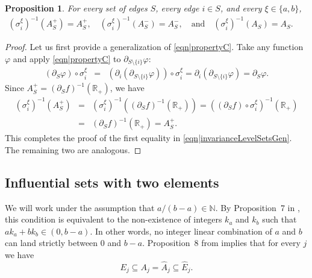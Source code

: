 \documentclass[reqno]{amsart}
\newtheorem{proposition}[theorem]{Proposition}
\begin{document}
\begin{proposition}\label{thm|invarianceLevelSetsGen}
For every set of edges $S$, every edge $i\in S$, and every $\xi\in\{a,b\}$, 
\begin{eqnarray}
\left(\sigma_i^{\xi}\right)^{-1}(A_S^+)=A_S^+ 
,\quad 
\left(\sigma_i^{\xi}\right)^{-1}(A_S^-)=A_S^-,\quad\mbox{and} \quad
\left(\sigma_i^{\xi}\right)^{-1}(A_S)=A_S. &&
\label{eqn|invarianceLevelSetsGen}
\end{eqnarray}
\end{proposition}
\begin{proof}
Let us first provide a generalization of \eqref{eqn|propertyC}. Take any function $\varphi$ and apply \eqref{eqn|propertyC} to $\partial_{S\setminus\{i\}}\varphi$:  
\begin{eqnarray}
\left(\partial_S\varphi\right)\circ \sigma_i^{\xi}&=&\left(\partial_i\left(\partial_{S\setminus\{i\}}\varphi\right) \right)\circ
\sigma_i^{\xi}= \partial_i\left(\partial_{S\setminus\{i\}}\varphi\right) =\partial_S\varphi. \label{eqn|propertyCGen}
\end{eqnarray}
Since $A_S^+=\left(\partial_Sf\right)^{-1}(\mathbb R_+)$, we have 
\begin{eqnarray*}
\left(\sigma_i^{\xi}\right)^{-1}(A_S^+)&=&
\left(\sigma_i^{\xi}\right)^{-1}\left(\left(\partial_Sf\right)^{-1}(\mathbb R_+)\right)= \left(\left(\partial_Sf\right)\circ \sigma_i^{\xi}\right)^{-1}(\mathbb R_+)\\ &=&
\left( \partial_Sf \right)^{-1}(\mathbb R_+)=A_S^+.
\end{eqnarray*}
This completes the proof of the first equality in \eqref{eqn|invarianceLevelSetsGen}. The remaining two are analogous.
\end{proof}

  





\subsection{Influential sets with two elements}
We will work under the assumption that $a/(b-a)\in\mathbb N$. By 
Proposition~7 %
in \cite{FirstPaper2025}, this condition is equivalent 
to the non-existence of integers $k_a$ and $k_b$ such that 
$ak_a+bk_b\in(0,b-a)$. In other words, no integer linear combination 
of $a$ and $b$ can land strictly between $0$ and $b-a$. 
Proposition~8 %
 from \cite{FirstPaper2025} implies that for every $j$ we have \[E_j\subseteq A_j=\hat A_j\subseteq \hat E_j.\]
\end{document}
